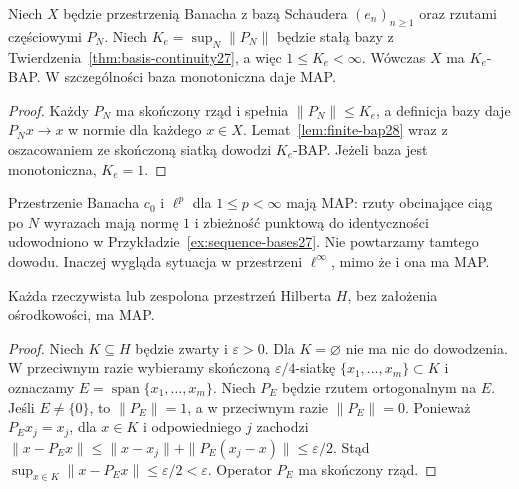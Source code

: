 \begin{twierdzenie}
\label{thm:basis-implies-bap28}
Niech $X$ będzie przestrzenią Banacha z bazą Schaudera
$(e_n)_{n\ge1}$ oraz rzutami częściowymi $P_N$.
Niech $K_e=\sup_N\|P_N\|$ będzie stałą bazy z
Twierdzenia~\ref{thm:basis-continuity27}, a więc $1\le K_e<\infty$.
Wówczas $X$ ma $K_e$-BAP.
W szczególności baza monotoniczna daje MAP.
\end{twierdzenie}
\begin{proof}
Każdy $P_N$ ma skończony rząd i spełnia
$\|P_N\|\le K_e$, a definicja bazy daje
$P_Nx\to x$ w normie dla każdego $x\in X$.
Lemat~\ref{lem:finite-bap28} wraz z oszacowaniem
ze skończoną siatką dowodzi $K_e$-BAP.
Jeżeli baza jest monotoniczna, $K_e=1$.
\end{proof}

\begin{przyklad}
\label{ex:sequence-map28}
Przestrzenie Banacha $c_0$ i $\ell^p$ dla
$1\le p<\infty$ mają MAP: rzuty obcinające ciąg
po $N$ wyrazach mają normę $1$ i zbieżność punktową
do identyczności udowodniono w Przykładzie~\ref{ex:sequence-bases27}.
Nie powtarzamy tamtego dowodu. Inaczej wygląda sytuacja
w przestrzeni $\ell^\infty$, mimo że i ona ma MAP.
\end{przyklad}

\begin{twierdzenie}
\label{thm:hilbert-map28}
Każda rzeczywista lub zespolona przestrzeń Hilberta $H$,
bez założenia ośrodkowości, ma MAP.
\end{twierdzenie}
\begin{proof}
Niech $K\subseteq H$ będzie zwarty i $\varepsilon>0$.
Dla $K=\varnothing$ nie ma nic do dowodzenia.
W przeciwnym razie wybieramy skończoną $\varepsilon/4$-siatkę
$\{x_1,\ldots,x_m\}\subset K$ i oznaczamy
$E=\operatorname{span}\{x_1,\ldots,x_m\}$.
Niech $P_E$ będzie rzutem ortogonalnym na $E$.
Jeśli $E\ne\{0\}$, to $\|P_E\|=1$, a w przeciwnym
razie $\|P_E\|=0$. Ponieważ $P_Ex_j=x_j$,
dla $x\in K$ i odpowiedniego $j$ zachodzi
$\|x-P_Ex\|\le\|x-x_j\|+\|P_E(x_j-x)\|
\le\varepsilon/2$.
Stąd $\sup_{x\in K}\|x-P_Ex\|\le\varepsilon/2<\varepsilon$.
Operator $P_E$ ma skończony rząd.
\end{proof}

